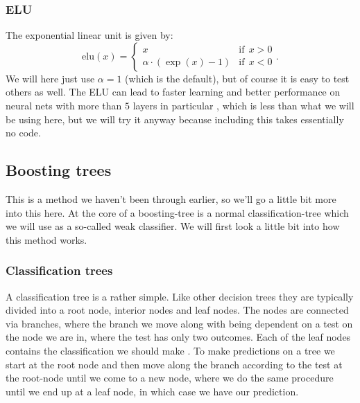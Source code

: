 \documentclass{article}
\begin{document}
\subsubsection{ELU}
The exponential linear unit is given by:
$$\text{elu}(x) = \begin{cases} x \qquad \qquad & \text{if}\ \ x > 0 \\ \alpha \cdot (\exp(x) - 1) & \text{if}\ \ x < 0 \end{cases}.$$ \cite{tensorflowdocelu}
We will here just use $\alpha = 1$ (which is the default), but of course it is
easy to test others as well. The ELU can lead to faster learning and better
performance on neural nets with more than $5$ layers in particular
\cite{clevert2016fast}, which is less than what we will be using here,
but we will try it anyway because including this takes essentially no code.

\subsection{Boosting trees}
This is a method we haven't been through earlier, so we'll go a little bit more
into this here. At the core of a boosting-tree is a normal classification-tree
which we will use as a so-called weak classifier. We will first look a little bit into how this method works.

\subsubsection{Classification trees}
A classification tree is a rather simple. Like other decision trees they are
typically divided into a root node, interior nodes and leaf nodes. The nodes
are connected via branches, where the branch we move along with being dependent
on a test on the node we are in, where the test has only two outcomes. Each of
the leaf nodes contains the classification we should make
\cite{lecturesweek46}. To make predictions on a tree we start at the root
node and then move along the branch according to the test at the root-node
until we come to a new node, where we do the same procedure until we end up at
a leaf node, in which case we have our prediction.
\end{document}
